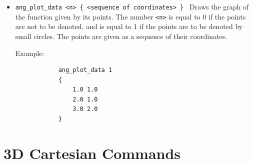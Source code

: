 \documentclass[a4paper]{book}
\begin{document}
\begin{itemize}
\item
\verb|ang_plot_data <n> { <sequence of coordinates> } |
        Draws the graph of the function given by its points.
        The number \verb|<n>| is equal to 0 if the points are not to be denoted,
        and is equal to 1 if the points are to be denoted by small circles.
        The points are given as a sequence of their coordinates.

        Example:
        \begin{verbatim}
            ang_plot_data 1
            {
                1.0 1.0
                2.0 1.0
                3.0 2.0
            }
        \end{verbatim}
\end{itemize}



\section{3D Cartesian Commands}
\end{document}
